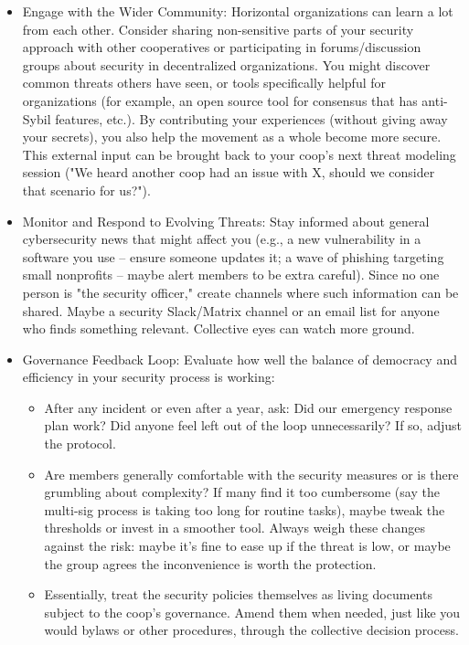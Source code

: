 \begin{itemize}
    \item Engage with the Wider Community: Horizontal organizations can learn a lot from each other. Consider
    sharing non-sensitive parts of your security approach with other cooperatives or participating in
    forums/discussion groups about security in decentralized organizations. You might discover common
    threats others have seen, or tools specifically helpful for organizations (for example, an open source tool
    for consensus that has anti-Sybil features, etc.). By contributing your experiences (without giving
    away your secrets), you also help the movement as a whole become more secure. This external input
    can be brought back to your coop's next threat modeling session ("We heard another coop had an issue
    with X, should we consider that scenario for us?").

    \item Monitor and Respond to Evolving Threats: Stay informed about general cybersecurity news that
    might affect you (e.g., a new vulnerability in a software you use – ensure someone updates it; a
    wave of phishing targeting small nonprofits – maybe alert members to be extra careful). Since no one
    person is "the security officer," create channels where such information can be shared. Maybe a
    security Slack/Matrix channel or an email list for anyone who finds something relevant. Collective
    eyes can watch more ground.

    \item Governance Feedback Loop: Evaluate how well the balance of democracy and efficiency in your
    security process is working:
        \begin{itemize}
            \item After any incident or even after a year, ask: Did our emergency response plan work? Did
            anyone feel left out of the loop unnecessarily? If so, adjust the protocol.
            \item Are members generally comfortable with the security measures or is there grumbling about
            complexity? If many find it too cumbersome (say the multi-sig process is taking too long for routine
            tasks), maybe tweak the thresholds or invest in a smoother tool. Always weigh these changes against
            the risk: maybe it's fine to ease up if the threat is low, or maybe the group agrees the
            inconvenience is worth the protection.
            \item Essentially, treat the security policies themselves as living documents subject to the coop's
            governance. Amend them when needed, just like you would bylaws or other procedures, through the
            collective decision process.
        \end{itemize}
\end{itemize}

